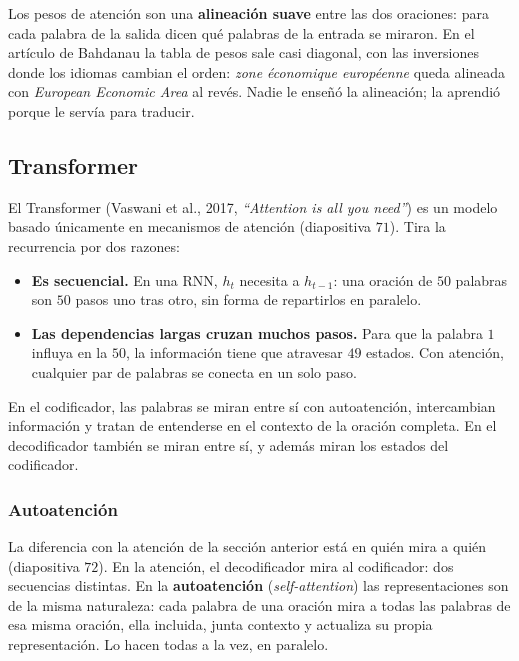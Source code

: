 \documentclass[11pt,letterpaper]{article}
\begin{document}
\begin{idea}
    Los pesos de atención son una \textbf{alineación suave} entre las
    dos oraciones: para cada palabra de la salida dicen qué palabras de
    la entrada se miraron. En el artículo de Bahdanau la tabla de pesos
    sale casi diagonal, con las inversiones donde los idiomas cambian el
    orden: \textit{zone économique européenne} queda alineada con
    \textit{European Economic Area} al revés. Nadie le enseñó la
    alineación; la aprendió porque le servía para traducir.
\end{idea}


\subsection*{Transformer}

El Transformer (Vaswani et al., 2017, \textit{``Attention is all you
need''}) es un modelo basado únicamente en mecanismos de atención
(diapositiva $71$). Tira la recurrencia por dos razones:

\begin{itemize}[itemsep=0.3em]
    \item \textbf{Es secuencial.} En una RNN, $h_t$ necesita a
          $h_{t-1}$: una oración de $50$ palabras son $50$ pasos uno
          tras otro, sin forma de repartirlos en paralelo.
    \item \textbf{Las dependencias largas cruzan muchos pasos.} Para
          que la palabra $1$ influya en la $50$, la información tiene
          que atravesar $49$ estados. Con atención, cualquier par de
          palabras se conecta en un solo paso.
\end{itemize}

En el codificador, las palabras se miran entre sí con autoatención,
intercambian información y tratan de entenderse en el contexto de la
oración completa. En el decodificador también se miran entre sí, y
además miran los estados del codificador.

\subsubsection*{Autoatención}

La diferencia con la atención de la sección anterior está en quién
mira a quién (diapositiva $72$). En la atención, el decodificador mira
al codificador: dos secuencias distintas. En la
\textbf{autoatención} (\textit{self-attention}) las representaciones
son de la misma naturaleza: cada palabra de una oración mira a todas
las palabras de esa misma oración, ella incluida, junta contexto y
actualiza su propia representación. Lo hacen todas a la vez, en
paralelo.
\end{document}
